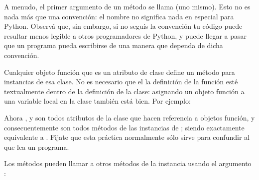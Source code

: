 \documentclass[a5paper,10pt,spanish]{sphinxmanual}
\begin{document}
\sphinxAtStartPar
A menudo, el primer argumento de un método se llama  (uno mismo).  Esto no es nada más que una convención: el nombre  no significa nada en especial para Python.  Observá que, sin embargo, si no seguís la convención tu código puede resultar menos legible a otros programadores de Python, y puede llegar a pasar que un programa  pueda escribirse de una manera que dependa de dicha convención.

\sphinxAtStartPar
Cualquier objeto función que es un atributo de clase define un método para instancias de esa clase.  No es necesario que el la definición de la función esté textualmente dentro de la definición de la clase: asignando un objeto función a una variable local en la clase también está bien.  Por ejemplo:

\begin{sphinxVerbatim}[commandchars=\\\{\}]
   
      

 
      

     
         

      
\end{sphinxVerbatim}

\sphinxAtStartPar
Ahora ,  y  son todos atributos de la clase  que hacen referencia a objetos función, y consecuentemente son todos métodos de las instancias de ;  siendo exactamente equivalente a . Fijate que esta práctica normalmente sólo sirve para confundir al que lea un programa.

\sphinxAtStartPar
Los métodos pueden llamar a otros métodos de la instancia usando el argumento :
\end{document}
